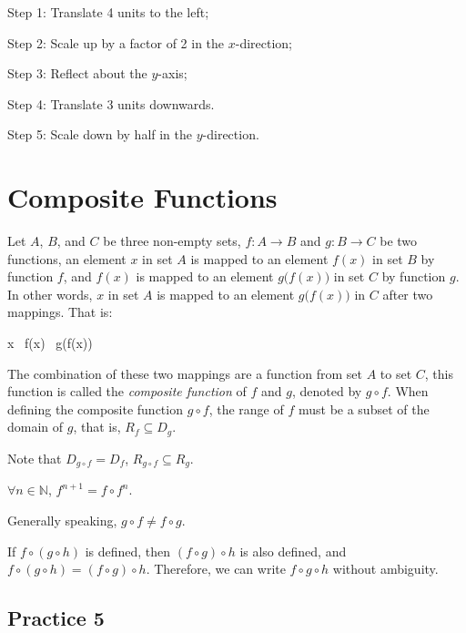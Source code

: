 \documentclass[12pt]{report}
\begin{document}
\begin{multicols}{2}
\begin{enumerate}
          Step 1: Translate 4 units to the left;

          Step 2: Scale up by a factor of 2 in the $x$-direction;

          Step 3: Reflect about the $y$-axis;

          Step 4: Translate 3 units downwards.

          Step 5: Scale down by half in the $y$-direction.
  \end{enumerate}

\end{multicols}

\section{Composite Functions}

Let $A$, $B$, and $C$ be three non-empty sets, $f: A \to B$ and $g: B \to C$ be
two functions, an element $x$ in set $A$ is mapped to an element $f(x)$ in set
$B$ by function $f$, and $f(x)$ is mapped to an element $g\big(f(x)\big)$ in
set $C$ by function $g$. In other words, $x$ in set $A$ is mapped to an element
$g\big(f(x)\big)$ in $C$ after two mappings. That is:
\begin{cequation}
  x\  f(x)\  g\big(f(x)\big)
\end{cequation}

The combination of these two mappings are a function from set $A$ to set $C$,
this function is called the \emph{composite function} of $f$ and $g$, denoted
by $g \circ f$. When defining the composite function $g \circ f$, the range of
$f$ must be a subset of the domain of $g$, that is, $R_f \subseteq D_g$.

Note that $D_{g \circ f} = D_f$, $R_{g \circ f} \subseteq R_g$.

$\forall n \in \mathbb{N}$, $f^{n+1} = f \circ f^n$.

Generally speaking, $g \circ f \neq f \circ g$.

If $f \circ (g \circ h)$ is defined, then $(f \circ g) \circ h$ is also
defined, and $f \circ (g \circ h) = (f \circ g) \circ h$. Therefore, we can
write $f \circ g \circ h$ without ambiguity.

\subsection*{Practice 5}

\setlength{\columnseprule}{1pt}
\setlength{\columnsep}{24pt}
\end{document}
